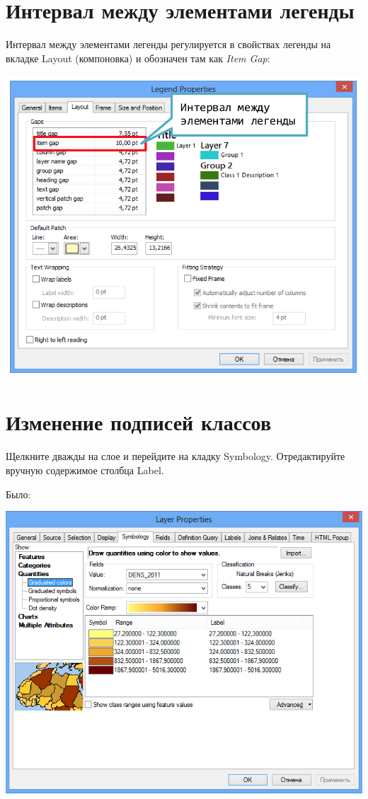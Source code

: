 \documentclass[]{book}
\theoremstyle{definition}
\theoremstyle{definition}
\theoremstyle{definition}
\theoremstyle{remark}
\begin{document}
\hypertarget{---}{%
\section{Интервал между элементами легенды}\label{---}}

Интервал между элементами легенды регулируется в свойствах легенды на
вкладке Layout (компоновка) и обозначен там как \emph{Item Gap}:

\includegraphics{images/Appendix/image61.png}

\hypertarget{--}{%
\section{Изменение подписей классов}\label{--}}

Щелкните дважды на слое и перейдите на кладку Symbology. Отредактируйте
вручную содержимое столбца Label.

Было:

\includegraphics{images/Appendix/image62.png}
\end{document}

